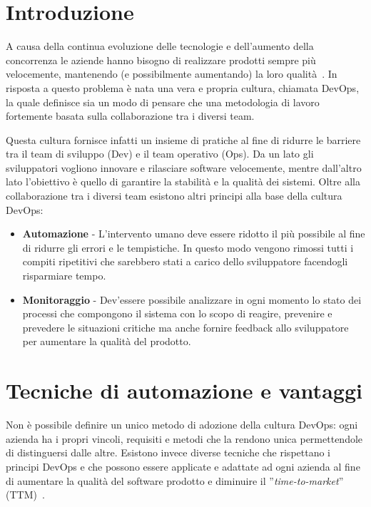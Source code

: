 
\section{Introduzione}
A causa della continua evoluzione delle tecnologie e dell'aumento della concorrenza le aziende hanno bisogno di realizzare prodotti sempre più velocemente, 
mantenendo (e possibilmente aumentando) la loro qualità~\cite{krief2019learning}. 
In risposta a questo problema è nata una vera e propria cultura, chiamata DevOps, 
la quale definisce sia un modo di pensare che una metodologia di lavoro fortemente basata sulla collaborazione tra i diversi team.

Questa cultura fornisce infatti un insieme di pratiche al fine di ridurre le barriere tra il team di sviluppo (Dev) e il team operativo (Ops). 
Da un lato gli sviluppatori vogliono innovare e rilasciare software velocemente, 
mentre dall'altro lato l'obiettivo è quello di garantire la stabilità e la qualità dei sistemi.
Oltre alla collaborazione tra i diversi team esistono altri principi alla base della cultura DevOps:

\begin{itemize}
    \item \textbf{Automazione} - L'intervento umano deve essere ridotto il più possibile al fine di ridurre gli errori e le tempistiche. In questo modo vengono rimossi tutti i compiti ripetitivi che sarebbero stati a carico dello sviluppatore facendogli risparmiare tempo.
    
    \item \textbf{Monitoraggio} - Dev'essere possibile analizzare in ogni momento lo stato dei processi che compongono il sistema con lo scopo di reagire, prevenire e prevedere le situazioni critiche ma anche fornire feedback allo sviluppatore per aumentare la qualità del prodotto.
\end{itemize}

\section{Tecniche di automazione e vantaggi}
Non è possibile definire un unico metodo di adozione della cultura DevOps: 
ogni azienda ha i propri vincoli, 
requisiti e metodi che la rendono unica permettendole di distinguersi dalle altre.
Esistono invece diverse tecniche che rispettano i principi DevOps e che possono essere applicate e adattate ad ogni azienda al fine di aumentare la qualità del software prodotto e diminuire il ''\textit{time-to-market}'' (TTM)~\cite{devis2016effective}.

